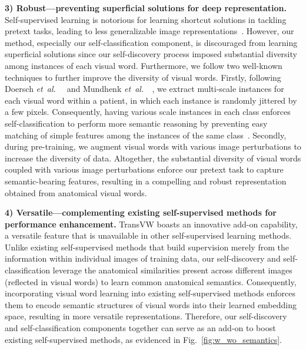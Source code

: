 \documentclass[journal,twoside,web]{ieeecolor}
\def\figurename{Fig.}
\newcommand{\etal}{\mbox{\emph{et al.\ }}}
\begin{document}
\medskip
\noindent\textbf{3) Robust---preventing superficial solutions for deep representation.} 
Self-supervised learning is notorious for learning shortcut solutions in tackling pretext tasks, leading to less generalizable image representations~\cite{Jenni2020Steering,doersch2015unsupervised}. However, our method, especially our self-classification component, is discouraged from learning superficial solutions since our self-discovery process imposed substantial diversity among instances of each visual word. Furthermore, we follow two well-known techniques to further improve the diversity of visual words. Firstly, following Doersch \etal~\cite{doersch2015unsupervised} and Mundhenk \etal~\cite{mundhenk2018improvements}, we extract multi-scale instances for each visual word within a patient, in which each instance is randomly jittered by a few pixels. Consequently, having various scale instances in each class enforces self-classification to perform more semantic reasoning by preventing easy matching of simple features among the instances of the same class~\cite{mundhenk2018improvements}. Secondly, during pre-training, we augment visual words with various image perturbations to increase the diversity of data. 
Altogether,  the  substantial  diversity  of  visual  words  coupled with various image perturbations enforce our pretext task to capture semantic-bearing features, resulting in a compelling and robust representation obtained from anatomical visual words.


\medskip
\noindent\textbf{4) Versatile---complementing existing self-supervised methods for performance enhancement.} 
TransVW boasts an innovative add-on capability, a versatile feature that is unavailable in other self-supervised learning methods. Unlike existing self-supervised methods that build supervision merely from the information within individual images of training data, our self-discovery and self-classification leverage the anatomical similarities present across different images (reflected in visual words) to learn common anatomical semantics. Consequently, incorporating visual word learning into existing self-supervised methods enforces them to encode semantic structures of visual words into their learned embedding space, resulting in more versatile representations. Therefore, our self-discovery and self-classification components together can serve as an add-on to boost existing self-supervised methods, as evidenced in \figurename~\ref{fig:w_wo_semantics}.
\end{document}
